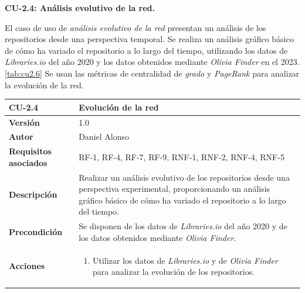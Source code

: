 \textbf{CU-2.4: Análisis evolutivo de la red.}

El caso de uso de \textit{análisis evolutivo de la red} presentan un análisis de los repositorios
desde una perspectiva temporal. Se realiza un análisis gráfico
básico de cómo ha variado el repositorio a lo largo del tiempo, utilizando los datos
de \textit{Libraries.io}\cite{jeremy_katz_2020_3626071} del año 2020 y los datos obtenidos mediante \textit{Olivia Finder} en el 2023. \ref{tab:cu2.6}
Se usan las métricas de centralidad de \textit{grado} y \textit{PageRank} para analizar la evolución de la red.


\begin{table}[p]
	\centering
	\begin{tabularx}{\linewidth}{ p{} p{} }
		\toprule
		\textbf{CU-2.4}               & \textbf{Evolución de la red}                                                                                                                                                              \\
		\toprule
		\textbf{Versión}              & 1.0                                                                                                                                                                                       \\
		\textbf{Autor}                & Daniel Alonso                                                                                                                                                                             \\
		\textbf{Requisitos asociados} & RF-1, RF-4, RF-7, RF-9, RNF-1, RNF-2, RNF-4, RNF-5                                                                                                                                        \\
		\textbf{Descripción}          & Realizar un análisis evolutivo de los repositorios desde una perspectiva experimental, proporcionando un análisis gráfico básico de cómo ha variado el repositorio a lo largo del tiempo. \\
		\textbf{Precondición}         & Se disponen de los datos de \textit{Libraries.io} del año 2020 y de los datos obtenidos mediante \textit{Olivia Finder}.                                                                  \\
		\textbf{Acciones}             & \begin{enumerate}
			                                \item Utilizar los datos de \textit{Libraries.io} y de \textit{Olivia Finder} para analizar la evolución de los repositorios.

\end{enumerate}
\end{tabularx}
\end{table}

